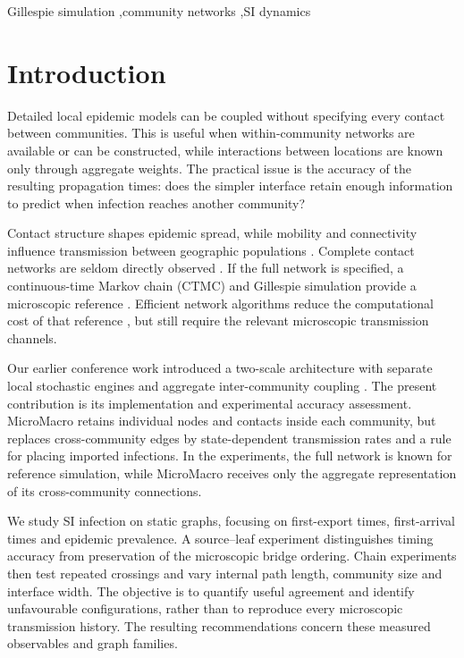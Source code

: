 \documentclass[a4paper,fleqn]{cas-sc}
\begin{document}
\begin{keywords}
Gillespie simulation \sep community networks \sep SI dynamics
\end{keywords}
\maketitle

\section{Introduction}
\label{sec:introduction}

Detailed local epidemic models can be coupled without specifying every contact between communities. This is useful when within-community networks are available or can be constructed, while interactions between locations are known only through aggregate weights. The practical issue is the accuracy of the resulting propagation times: does the simpler interface retain enough information to predict when infection reaches another community?

Contact structure shapes epidemic spread, while mobility and connectivity influence transmission between geographic populations \cite{keeling2005,pastorsatorras2015,balcan2009}. Complete contact networks are seldom directly observed \cite{danon2011}. If the full network is specified, a continuous-time Markov chain (CTMC) and Gillespie simulation provide a microscopic reference \cite{gillespie1977exact}. Efficient network algorithms reduce the computational cost of that reference \cite{vestergaard2015,kuryliak2025simulating}, but still require the relevant microscopic transmission channels.

Our earlier conference work introduced a two-scale architecture with separate local stochastic engines and aggregate inter-community coupling \cite{kuryliak2025towards}. The present contribution is its implementation and experimental accuracy assessment. MicroMacro retains individual nodes and contacts inside each community, but replaces cross-community edges by state-dependent transmission rates and a rule for placing imported infections. In the experiments, the full network is known for reference simulation, while MicroMacro receives only the aggregate representation of its cross-community connections.

We study SI infection on static graphs, focusing on first-export times, first-arrival times and epidemic prevalence. A source--leaf experiment distinguishes timing accuracy from preservation of the microscopic bridge ordering. Chain experiments then test repeated crossings and vary internal path length, community size and interface width. The objective is to quantify useful agreement and identify unfavourable configurations, rather than to reproduce every microscopic transmission history. The resulting recommendations concern these measured observables and graph families.
\end{document}
